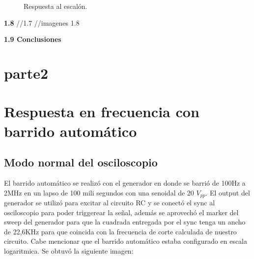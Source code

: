 \begin{figure}[H]
\qquad
{}%
\caption{Respuesta al escalón.}
\label{diagbodemedido}
\end{figure}

\textbf{1.8}
//1.7
//imagenes 1.8

\textbf{1.9 Conclusiones}

\section{parte2}

\section{Respuesta en frecuencia con barrido automático}

\subsection{Modo normal del osciloscopio}

El barrido automático se realizó con el generador en donde se barrió
de 100Hz a 2MHz en un lapso de 100 mili segundos con una senoidal
de 20 $V_{pp}$. El output del generador se utilizó para excitar al
circuito RC y se conectó el sync al osciloscopio para poder triggerear
la señal, además se aprovechó el marker del sweep del generador para
que la cuadrada entregada por el sync tenga un ancho de 22,6KHz para
que coincida con la frecuencia de corte calculada de nuestro circuito.
Cabe mencionar que el barrido automático estaba configurado en escala
logaritmica. Se obtuvó la siguiente imagen:

